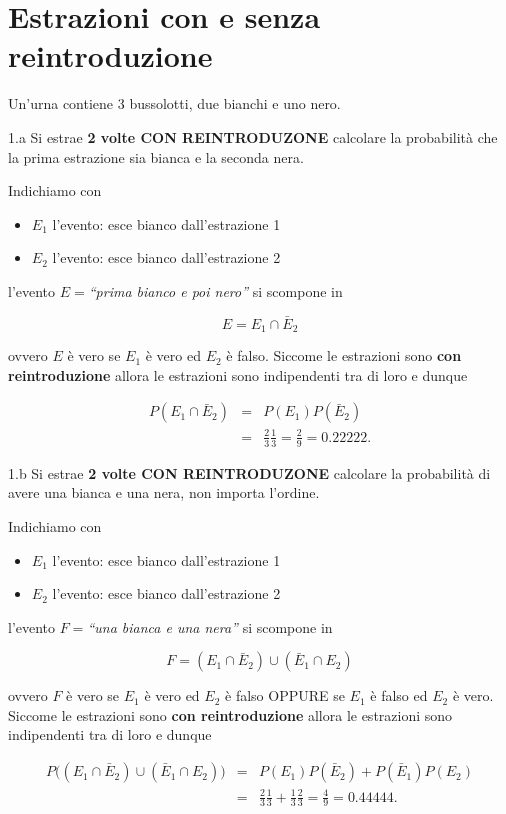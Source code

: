 \documentclass[
  11pt,
]{book}
\providecommand{\tightlist}{%
  \setlength{\itemsep}{0pt}\setlength{\parskip}{0pt}}
\theoremstyle{mytheoremstyle}
\theoremstyle{mydefstyle}
\newenvironment{sol}
  {
  \begin{tcolorbox}[enhanced,breakable,arc=0.1mm,boxrule=1pt,colback=white,colframe=iblue,
  title=\bf \fontfamily{lmss}\selectfont \hspace{.5 cm} Soluzione,drop fuzzy shadow]

}{
\end{tcolorbox}
  }
\begin{document}
\section{Estrazioni con e senza reintroduzione}\label{estrazioni-con-e-senza-reintroduzione}

Un'urna contiene 3 bussolotti, due bianchi e uno nero.

1.a Si estrae \textbf{2 volte CON REINTRODUZONE} calcolare la probabilità che
la prima estrazione sia bianca e la seconda nera.

\begin{sol}
Indichiamo con

\begin{itemize}
\tightlist
\item
  \(E_1\) l'evento: esce bianco dall'estrazione 1
\item
  \(E_2\) l'evento: esce bianco dall'estrazione 2
\end{itemize}

l'evento \(E=\)\emph{``prima bianco e poi nero''} si scompone in

\[
E=E_1\cap\bar E_2
\]

ovvero \(E\) è vero se \(E_1\) è vero ed \(E_2\) è falso. Siccome le estrazioni sono
\textbf{con reintroduzione} allora le estrazioni sono indipendenti tra di loro e dunque

\begin{eqnarray*}
    P(E_1 \cap \bar E_2)
&=& P(E_1)P(\bar E_2)\\
&=& \frac{2}{3} \frac{1}{3}
 =  \frac{2}{9}
 =  0.22222.
\end{eqnarray*}

\end{sol}

1.b Si estrae \textbf{2 volte CON REINTRODUZONE} calcolare la probabilità di avere
una bianca e una nera, non importa l'ordine.

\begin{sol}
Indichiamo con

\begin{itemize}
\tightlist
\item
  \(E_1\) l'evento: esce bianco dall'estrazione 1
\item
  \(E_2\) l'evento: esce bianco dall'estrazione 2
\end{itemize}

l'evento \(F=\)\emph{``una bianca e una nera''} si scompone in

\[
F=(E_1\cap\bar E_2)\cup(\bar E_1\cap E_2)
\]

ovvero \(F\) è vero se \(E_1\) è vero ed \(E_2\) è falso OPPURE se \(E_1\) è falso ed \(E_2\) è vero.
Siccome le estrazioni sono \textbf{con reintroduzione} allora le estrazioni sono indipendenti
tra di loro e dunque

\begin{eqnarray*}
    P\big((E_1\cap\bar E_2)\cup(\bar E_1\cap E_2)\big)
&=& P(E_1)P(\bar E_2)+P(\bar E_1)P(E_2)\\
&=& \frac{2}{3} \frac{1}{3} + \frac{1}{3} \frac{2}{3} 
 =  \frac{4}{9}
 =  0.44444.
\end{eqnarray*}

\end{sol}
\end{document}
